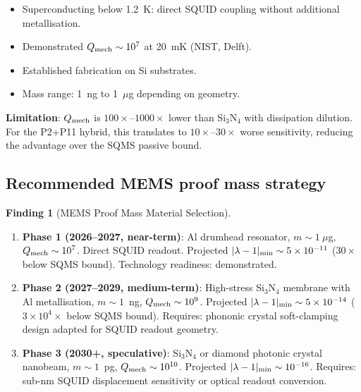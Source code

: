 \documentclass[11pt]{article}
\theoremstyle{definition}
\newtheorem{finding}[theorem]{Finding}
\theoremstyle{remark}
\newcommand{\ee}[1]{\times 10^{#1}}
\newcommand{\lam}{|\lambda-1|}
\begin{document}
\begin{itemize}[nosep]
  \item Superconducting below 1.2~K: direct SQUID coupling without
    additional metallisation.
  \item Demonstrated $Q_{\rm mech} \sim 10^7$ at 20~mK (NIST, Delft).
  \item Established fabrication on Si substrates.
  \item Mass range: 1~ng to 1~$\mu$g depending on geometry.
\end{itemize}

\textbf{Limitation}: $Q_{\rm mech}$ is $100\times$--$1000\times$ lower
than Si$_3$N$_4$ with dissipation dilution. For the P2+P11 hybrid,
this translates to $10\times$--$30\times$ worse sensitivity, reducing
the advantage over the SQMS passive bound.

\subsection{Recommended MEMS proof mass strategy}

\begin{finding}[MEMS Proof Mass Material Selection]
\label{find:mems_selection}
\begin{enumerate}[nosep]
  \item \textbf{Phase 1 (2026--2027, near-term)}: Al drumhead resonator,
    $m \sim 1~\mu$g, $Q_{\rm mech} \sim 10^7$. Direct SQUID readout.
    Projected $\lam_{\rm min} \sim 5\ee{-11}$ ($30\times$ below SQMS bound).
    Technology readiness: demonstrated.

  \item \textbf{Phase 2 (2027--2029, medium-term)}: High-stress
    Si$_3$N$_4$ membrane with Al metallisation, $m \sim 1$~ng,
    $Q_{\rm mech} \sim 10^9$. Projected $\lam_{\rm min} \sim 5\ee{-14}$
    ($3\ee{4}\times$ below SQMS bound). Requires: phononic crystal
    soft-clamping design adapted for SQUID readout geometry.

  \item \textbf{Phase 3 (2030+, speculative)}: Si$_3$N$_4$ or diamond
    photonic crystal nanobeam, $m \sim 1$~pg, $Q_{\rm mech} \sim 10^{10}$.
    Projected $\lam_{\rm min} \sim 10^{-16}$. Requires: sub-nm SQUID
    displacement sensitivity or optical readout conversion.
\end{enumerate}
\end{finding}


\end{document}
